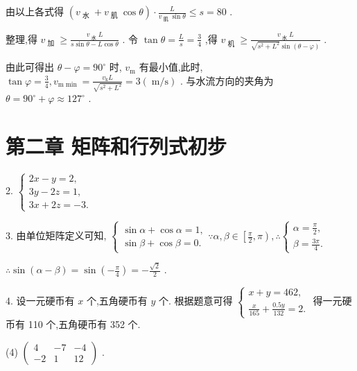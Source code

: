 \documentclass[10pt]{article}
\begin{document}
由以上各式得 \(\left( {{v}_{\text{ 水 }} + {v}_{\text{ 肌 }}\cos \theta }\right)  \cdot  \frac{L}{{v}_{\text{ 肌 }}\sin \theta } \leq  s = {80}\) .

整理,得 \({v}_{\text{ 加 }} \geq  \frac{{v}_{\text{ 水 }}L}{s\sin \theta  - L\cos \theta }\) . 令 \(\tan \theta  = \frac{L}{s} = \frac{3}{4}\) ,得 \({v}_{\text{ 机 }} \geq  \frac{{v}_{\text{ 水 }}L}{\sqrt{{s}^{2} + {L}^{2}}\sin \left( {\theta  - \varphi }\right) }\) .

由此可得出 \(\theta  - \varphi  = {90}^{ \circ  }\) 时, \({v}_{\mathrm{m}}\) 有最小值,此时, \(\tan \varphi  = \frac{3}{4},{v}_{\mathrm{m}\min } = \frac{{v}_{\mathrm{k}}L}{\sqrt{{s}^{2} + {L}^{2}}} = 3\left( {\mathrm{\;m}/\mathrm{s}}\right)\) . 与水流方向的夹角为 \(\theta  = {90}^{ \circ  } + \varphi  \approx  {127}^{ \circ  }\) .

\section*{第二章 矩阵和行列式初步}

2. \(\left\{  \begin{array}{l} {2x} - y = 2, \\  {3y} - {2z} = 1, \\  {3x} + {2z} =  - 3. \end{array}\right.\)

3. 由单位矩阵定义可知, \(\left\{  {\begin{array}{l} \sin \alpha  + \cos \alpha  = 1, \\  \sin \beta  + \cos \beta  = 0. \end{array}\because \alpha ,\beta  \in  \left\lbrack  {\frac{\pi }{2},\pi }\right) ,\therefore \left\{  \begin{array}{l} \alpha  = \frac{\pi }{2}, \\  \beta  = \frac{3\pi }{4}. \end{array}\right. }\right.\)

\(\therefore \sin \left( {\alpha  - \beta }\right)  = \sin \left( {-\frac{\pi }{4}}\right)  =  - \frac{\sqrt{2}}{2}\) .

4. 设一元硬币有 \(x\) 个,五角硬币有 \(y\) 个. 根据题意可得 \(\left\{  \begin{array}{l} x + y = {462}, \\  \frac{x}{165} + \frac{0.5y}{132} = 2. \end{array}\right.\) 得一元硬币有 110 个,五角硬币有 352 个.

(4) \(\left( \begin{matrix} 4 &  - 7 &  - 4 \\   - 2 & 1 & {12} \end{matrix}\right)\) .
\end{document}
